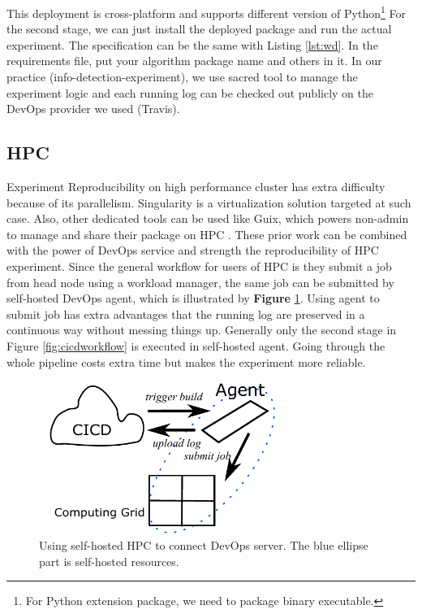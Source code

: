 \documentclass{IEEEcsmag}
\begin{document}
This deployment is cross-platform and supports different version of Python\footnote{For Python extension package, we need to package binary executable.} For the second stage, we can just install the deployed package and run the actual experiment. The specification can be the same with Listing \ref{lst:wd}. In the requirements file, put your algorithm package name and others in it. In our practice (info-detection-experiment), we use sacred tool \cite{greff2017sacred} to manage the experiment logic and each running log can be checked out publicly on the DevOps provider we used (Travis).



\subsection{HPC}
Experiment Reproducibility on high performance cluster has extra difficulty because of its parallelism. Singularity is a virtualization solution targeted at such case. %
Also, other dedicated tools can be used like Guix, which powers non-admin to manage and share their package on HPC \cite{courtes2015reproducible}. These prior work can be combined with the power of DevOps service and strength the reproducibility of HPC experiment. Since the general workflow for users of HPC is they submit a job from head node using a workload manager, the same job can be submitted by self-hosted DevOps agent, which is illustrated by {\bf Figure} \ref{fig:selfhosted}. Using agent to submit job has extra advantages that the running log are preserved in a continuous way without messing things up. Generally only the second stage in Figure \ref{fig:cicdworkflow}
is executed in self-hosted agent. Going through the whole pipeline costs extra time but makes the experiment more reliable.

\begin{figure}[!ht]
\centerline{\includegraphics[width=18.5pc]{self-hosted.pdf}}
\caption{Using self-hosted HPC to connect DevOps server. The blue ellipse part is self-hosted resources.}\label{fig:selfhosted}
\end{figure}
\end{document}
